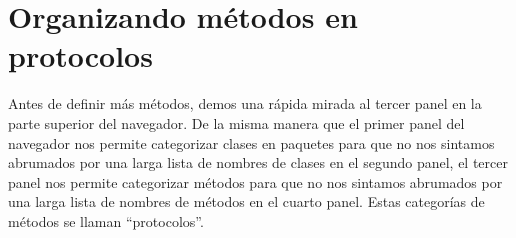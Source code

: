 \documentclass[a4paper,10pt,twoside]{book}
\begin{document}




\section{Organizando m\'etodos en protocolos}

Antes de definir m\'as m\'etodos, demos una r\'apida mirada al tercer panel en la parte superior del navegador. 
De la misma manera que el primer panel del navegador nos permite categorizar clases en paquetes para que no nos sintamos abrumados por una larga lista de nombres de clases en el segundo panel, el tercer panel nos permite categorizar m\'etodos para que no nos sintamos abrumados por una larga lista de nombres de m\'etodos en el cuarto panel.
Estas categor\'ias de m\'etodos se llaman ``protocolos''.
\end{document}
